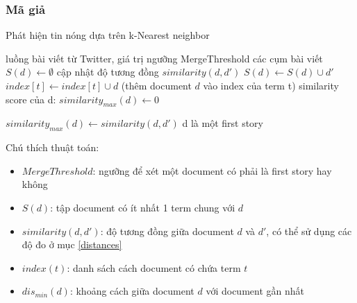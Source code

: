 	\subsubsection{Mã giả}
		\begin{algorithm}[H]
			\caption{Phát hiện tin nóng dựa trên k-Nearest neighbor}
			\begin{algorithmic}[1]
				\REQUIRE luồng bài viết từ Twitter, giá trị ngưỡng MergeThreshold
				\ENSURE các cụm bài viết
					\State $S(d) \leftarrow \emptyset$
							\State cập nhật độ tương đồng $similarity(d,d')$
							\State $S(d) \leftarrow S(d) \cup d'$
						\ENDFOR 
						\State $index[t] \leftarrow index[t] \cup d$ (thêm document $d$ vào index của term t)
					\ENDFOR
					\STATE similarity score của d: $similarity_{max}(d) \leftarrow 0$
					
							\STATE $similarity_{max}(d) \leftarrow similarity(d,d')$
						\ENDIF
					\ENDFOR
						\STATE d là một first story
					\ELSE
					
					\ENDIF
				\ENDFOR	
				
			\end{algorithmic}
		\end{algorithm}
		Chú thích thuật toán:
		\begin{itemize}
			\item $MergeThreshold$: ngưỡng để xét một document có phải là first story hay không
			\item $S(d)$: tập document có ít nhất 1 term chung với $d$
			\item $similarity(d,d')$: độ tương đồng giữa document $d$ và $d'$, có thể sử dụng các độ đo ở mục \ref{distances}
			\item $index(t)$: danh sách cách document có chứa term $t$
			\item $dis_{min}(d)$: khoảng cách giữa document $d$ với document gần nhất
		\end{itemize}
		
